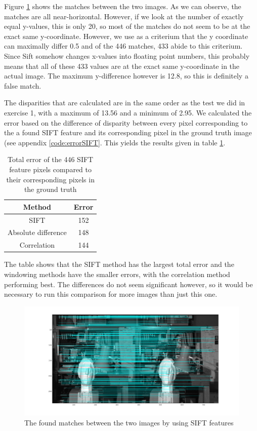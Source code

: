 \documentclass{article}
\begin{document}
Figure \ref{matches} shows the matches between the two images. As we can observe, the matches are all near-horizontal. However, if we look at the number of exactly equal y-values, this is only 20, so most of the matches do not seem to be at the exact same y-coordinate. However, we use as a criterium that the y coordinate can maximally differ 0.5 and of the 446 matches, 433 abide to this criterium. Since Sift somehow changes x-values into floating point numbers, this probably means that all of these 433 values are at the exact same y-coordinate in the actual image. The maximum y-difference however is 12.8, so this is definitely a false match.

The disparities that are calculated are in the same order as the test we did in exercise 1, with a maximum of 13.56 and a minimum of 2.95. We calculated the error based on the difference of disparity between every pixel corresponding to the a found SIFT feature and its corresponding pixel in the ground truth image (see appendix \ref{code:errorSIFT}. This yields the results given in table \ref{table2}. 

\begin{table}[!ht]
 \centering
 \caption{Total error of the 446 SIFT feature pixels compared to their corresponding pixels in the ground truth}
 \begin{tabular}{c|c}
 Method & Error \\
 \hline
 SIFT & 152 \\
 Absolute difference & 148 \\
 Correlation & 144
 \end{tabular}
 \label{table2}
\end{table}
The table shows that the SIFT method has the largest total error and the windowing methods have the smaller errors, with the correlation method performing best. The differences do not seem significant however, so it would be necessary to run this comparison for more images than just this one. 

\begin{figure}[ht!]
 \centering
 \includegraphics[width = \linewidth]{matches.png}
 \caption{The found matches between the two images by using SIFT features}
 \label{matches}
\end{figure}
\end{document}
